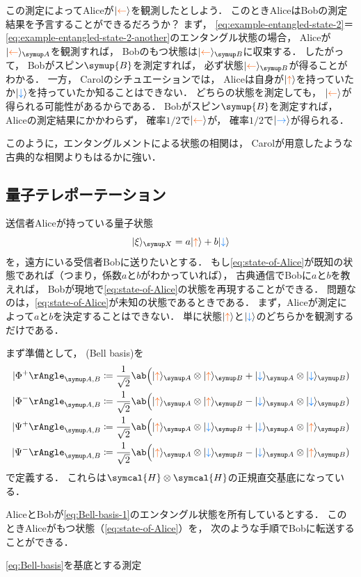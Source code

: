 \documentclass[
]{sotsu}
\newcommand{\bitone}{\mathcolor{fire}{\uparrow}}
\newcommand{\bittwo}{\mathcolor{water}{\downarrow}}
\newcommand{\bitthr}{\mathcolor{fire}{\leftarrow}}
\newcommand{\bitfou}{\mathcolor{water}{\rightarrow}}
\begin{document}
この測定によってAliceが$\ket{\bitthr}$を観測したとしよう．
このときAliceはBobの測定結果を予言することができるだろうか？\quad 
まず，
\cref{eq:example-entangled-state-2}＝\cref{eq:example-entangled-state-2-another}のエンタングル状態の場合，
Aliceが$\ket{\bitthr}<A>$を観測すれば，
Bobのもつ状態は$\ket{\bitthr}<B>$に収束する．
したがって，
Bobがスピン$\symup{B}$を測定すれば，
必ず状態$\ket{\bitthr}<B>$が得ることがわかる．
一方，
Carolのシチュエーションでは，
Aliceは自身が$\ket{\bitone}$を持っていたか$\ket{\bittwo}$を持っていたか知ることはできない．
どちらの状態を測定しても，
$\ket{\bitthr}$が得られる可能性があるからである．
Bobがスピン$\symup{B}$を測定すれば，
Aliceの測定結果にかかわらず，
確率$1/2$で$\ket{\bitthr}$が，
確率$1/2$で$\ket{\bitfou}$が得られる．

このように，エンタングルメントによる状態の相関は，
Carolが用意したような古典的な相関よりもはるかに強い．



\subsection{量子テレポーテーション}

送信者Aliceが持っている量子状態
\begin{equation}
    \label{eq:state-of-Alice}
    \ket{\xi}<X> = a \ket{\bitone} + b \ket{\bittwo}
\end{equation}
を，遠方にいる受信者Bobに送りたいとする．
もし\cref{eq:state-of-Alice}が既知の状態であれば（つまり，係数$a$と$b$がわかっていれば），
古典通信でBobに$a$と$b$を教えれば，
Bobが現地で\cref{eq:state-of-Alice}の状態を再現することができる．
問題なのは，\cref{eq:state-of-Alice}が未知の状態であるときである．
まず，Aliceが測定によって$a$と$b$を決定することはできない．
単に状態$\ket{\bitone}$と$\ket{\bittwo}$のどちらかを観測するだけである．


\quad 
まず準備として，
(Bell basis)を
\begin{subequations}
    \label{eq:Bell-basis}
    \begin{align}
        \label{eq:Bell-basis-1}
        \Ket{\Phi^+}<A,B> 
            &\coloneq \frac{1}{\sqrt{2}}
                \ab\Big( \ket{\bitone}<A> \otimes \ket{\bitone}<B> + \ket{\bittwo}<A> \otimes \ket{\bittwo}<B> )
        \\
        \Ket{\Phi^-}<A,B> 
            &\coloneq \frac{1}{\sqrt{2}}
                \ab\Big( \ket{\bitone}<A> \otimes \ket{\bitone}<B> - \ket{\bittwo}<A> \otimes \ket{\bittwo}<B> )
        \\
        \Ket{\Psi^+}<A,B> 
            &\coloneq \frac{1}{\sqrt{2}}
                \ab\Big( \ket{\bitone}<A> \otimes \ket{\bittwo}<B> + \ket{\bittwo}<A> \otimes \ket{\bitone}<B> )
        \\
        \Ket{\Psi^-}<A,B> 
            &\coloneq \frac{1}{\sqrt{2}}
                \ab\Big( \ket{\bitone}<A> \otimes \ket{\bittwo}<B> - \ket{\bittwo}<A> \otimes \ket{\bitone}<B> )
    \end{align}
\end{subequations}
で定義する．
これらは$\symcal{H} \otimes \symcal{H}$の正規直交基底になっている．


AliceとBobが\cref{eq:Bell-basis-1}のエンタングル状態を所有しているとする．
このときAliceがもつ状態（\cref{eq:state-of-Alice}）を，
次のような手順でBobに転送することができる．

\cref{eq:Bell-basis}を基底とする測定
\end{document}
